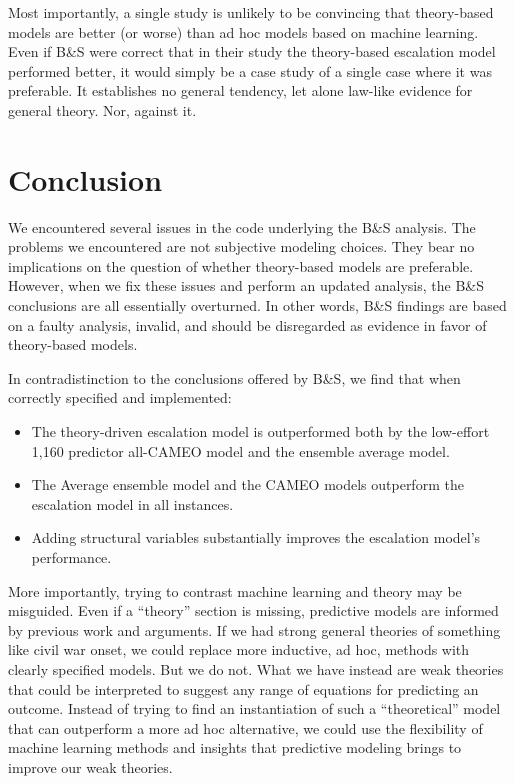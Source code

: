 \documentclass[
]{article}
\providecommand{\tightlist}{%
  \setlength{\itemsep}{0pt}\setlength{\parskip}{0pt}}
\begin{document}
Most importantly, a single study is unlikely to be convincing that theory-based models are better (or worse) than ad hoc models based on machine learning. Even if B\&S were correct that in their study the theory-based escalation model performed better, it would simply be a case study of a single case where it was preferable. It establishes no general tendency, let alone law-like evidence for general theory. Nor, against it.

\hypertarget{conclusion}{%
\section{Conclusion}\label{conclusion}}

We encountered several issues in the code underlying the B\&S analysis. The problems we encountered are not subjective modeling choices. They bear no implications on the question of whether theory-based models are preferable. However, when we fix these issues and perform an updated analysis, the B\&S conclusions are all essentially overturned. In other words, B\&S findings are based on a faulty analysis, invalid, and should be disregarded as evidence in favor of theory-based models.

In contradistinction to the conclusions offered by B\&S, we find that when correctly specified and implemented:

\begin{itemize}
\tightlist
\item
  The theory-driven escalation model is outperformed both by the low-effort 1,160 predictor all-CAMEO model and the ensemble average model.
\item
  The Average ensemble model and the CAMEO models outperform the escalation model in all instances.
\item
  Adding structural variables substantially improves the escalation model's performance.
\end{itemize}

More importantly, trying to contrast machine learning and theory may be misguided. Even if a ``theory'' section is missing, predictive models are informed by previous work and arguments. If we had strong general theories of something like civil war onset, we could replace more inductive, ad hoc, methods with clearly specified models. But we do not. What we have instead are weak theories that could be interpreted to suggest any range of equations for predicting an outcome. Instead of trying to find an instantiation of such a ``theoretical'' model that can outperform a more ad hoc alternative, we could use the flexibility of machine learning methods and insights that predictive modeling brings to improve our weak theories.
\end{document}
